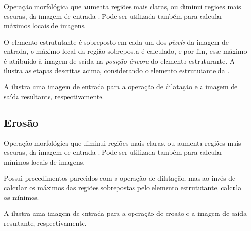 \par Operação morfológica que aumenta regiões mais claras, ou diminui regiões mais escuras, da imagem de entrada \cite{gonsalez2006}. Pode ser utilizada também para calcular máximos locais de imagens.

\par O elemento estrututante é sobreposto em cada um dos \textit{pixels} da imagem de entrada, o máximo local da região sobreposta é calculado, e por fim, esse máximo é atribuído à imagem de saída na \textit{posição âncora} do elemento estruturante. A  ilustra as etapas descritas acima, considerando o elemento estrututante da .


\par A  ilustra uma imagem de entrada para a operação de dilatação e a imagem de saída resultante, respectivamente.

%

\subsection{Erosão} \label{sec:morf:ero}

\par Operação morfológica que diminui regiões mais claras, ou aumenta regiões mais escuras, da imagem de entrada \cite{gonsalez2006}. Pode ser utilizada também para calcular mínimos locais de imagens.

\par Possui procedimentos parecidos com a operação de dilatação, mas ao invés de calcular os máximos das regiões sobrepostas pelo elemento estrututante, calcula os mínimos.

\par A  ilustra uma imagem de entrada para a operação de erosão e a imagem de saída resultante, respectivamente.

%

